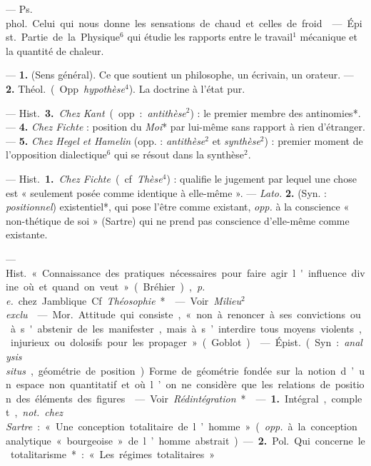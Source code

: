 \begin{itemize}[leftmargin=1cm, label=, itemsep=1pt]
 — \si{Ps. phol.} Celui qui nous donne les sensations de
chaud et celles de froid.

 — \si{Épist.} Partie de la Physique$^6$ qui étudie les
rapports entre le travail$^1$ mécanique et la quantité de chaleur.

 — {\bf 1.} (Sens général). Ce que soutient un philosophe, un
écrivain, un orateur. — {\bf 2.} \si{Théol.} (Opp. {\it hypothèse}$^4$). La
doctrine à l'état pur.

— \si{Hist.} {\bf 3.} {\it Chez Kant} (opp. : {\it antithèse}$^2$) : le
premier membre des antinomies*. — {\bf 4.} {\it Chez Fichte} : position du
{\it Moi}* par lui-même sans rapport à rien d’étranger. — {\bf 5.} {\it Chez
Hegel et Hamelin} (opp. : {\it antithèse}$^2$ et {\it synthèse}$^2$) :
premier moment de l'opposition dialectique$^6$ qui se résout dans la
synthèse$^2$.

 — \si{Hist.} {\bf 1.} {\it Chez Fichte} (cf. {\it Thèse}$^4$) :
qualifie le jugement par lequel une chose est « seulement posée comme
identique à elle-même ». — {\it Lato.} {\bf 2.} (Syn. : {\it positionnel})
existentiel*, qui pose l'être comme existant, {\it opp.} à la conscience «
non-thétique de soi » (Sartre) qui ne prend pas conscience d’elle-même comme
existante.

 — \si{Hist.} « Connaissance des pratiques nécessaires pour
faire agir l'influence divine où et quand on veut » (Bréhier), {\it p. e.}
chez Jamblique. Cf. {\it Théosophie}*.

 — Voir {\it Milieu$^2$ exclu}.

 — \si{Mor.} Attitude qui consiste, « non à renoncer à ses
convictions ou à s'abstenir de les manifester, mais à s’interdire tous moyens
violents, injurieux ou dolosifs pour les propager » (Goblot).

 — \si{Épist.} (Syn. : {\it analysis situs}, géométrie de
position). Forme de géométrie fondée sur la notion d’un espace non
quantitatif et où l’on ne considère que les relations de position des
éléments des figures.

 — Voir {\it Rédintégration}*.

 — {\bf 1.} Intégral, complet, {\it not.} {\it chez Sartre} :
« Une conception totalitaire de l’homme » ({\it opp.} à la conception
analytique « bourgeoise » de l’homme abstrait). — {\bf 2.} \si{Pol.} Qui
concerne le totalitarisme* : « Les régimes totalitaires. »


\end{itemize}
